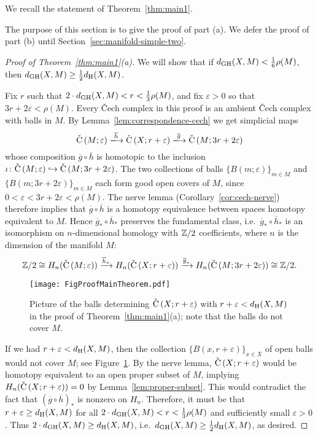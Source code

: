 \documentclass[11pt, reqno, english]{amsart}
\newcommand{\og}{\overline{g}}
\newcommand{\oh}{\overline{h}}
\begin{document}
We recall the statement of Theorem~\ref{thm:main1}.

\vspace{3mm}
\mainOne*
\vspace{3mm}

The purpose of this section is to give the proof of part (a).
We defer the proof of part (b) until Section~\ref{sec:manifold-simple-two}.

\begin{proof}[Proof of Theorem~\ref{thm:main1}(a)]
We will show that if $d_{\mathrm{GH}}(X,M) < \frac{1}{6}\rho(M)$, then $d_{\mathrm{GH}}(X,M) \ge \frac{1}{2}d_{\mathrm{H}}(X,M)$.

Fix $r$ such that $2\cdot d_{\mathrm{GH}}(X,M)<r
<\frac{1}{3}\rho(M)$, and fix $\varepsilon>0$ so that $3r+2\varepsilon<\rho(M)$.
Every \v{C}ech complex in this proof is an ambient \v{C}ech complex with balls in $M$.
By Lemma~\ref{lem:correspondence-cech} we get simplicial maps
\[
\cech{M}{\varepsilon} 
\xlongrightarrow{\oh} \cech{X}{r+\varepsilon}
\xlongrightarrow{\og} \cech{M}{3r+2\varepsilon}
\]    
whose composition $\og \circ \oh$ is homotopic to the inclusion
$\iota\colon \mathrm{\check{C}}\left(M;\varepsilon\right) \hookrightarrow \mathrm{\check{C}}\left(M;3r+2\varepsilon\right)$.
The two collections of balls $\{B(m;\varepsilon)\}_{m\in M}$ and $\{B(m;3r+2\varepsilon)\}_{m\in M}$ each form good open covers of $M$, since $0<\varepsilon<3r+2\varepsilon<\rho(M)$.
The nerve lemma (Corollary~\ref{cor:cech-nerve}) therefore implies that $\og \circ \oh$ is a homotopy equivalence between spaces homotopy equivalent to $M$.
Hence $\og_*\circ\oh_*$ preserves the fundamental class, i.e.\ $\og_*\circ\oh_*$ is an isomorphism on $n$-dimensional homology with $\mathbb{Z}/2$ coefficients, where $n$ is the dimension of the manifold $M$:
\[\Z/2 \cong H_n(\cech{M}{\varepsilon}) \xrightarrow{\oh_*} H_n(\cech{X}{r+\varepsilon}) \xrightarrow{\og_*} H_n(\cech{M}{3r+2\varepsilon}) \cong \Z/2.\]

\begin{figure}[htb]
\centering
\texttt{[image: FigProofMainTheorem.pdf]}
\caption{Picture of the balls determining $\mathrm{\check{C}}\left(X;r+\varepsilon\right)$ with $r+\varepsilon < d_{\mathrm{H}}(X,M)$ in the proof of Theorem~\ref{thm:main1}(a); note that the balls do not cover $M$.}
\label{fig:proof-main-thm}
\end{figure}

If we had $r+\varepsilon < d_{\mathrm{H}}(X,M)$, then the collection $\{B(x,r+\varepsilon)\}_{x\in X}$ of open balls would not cover $M$; see Figure~\ref{fig:proof-main-thm}.
By the nerve lemma, $\mathrm{\check{C}}\left(X;r+\varepsilon\right)$ would be homotopy equivalent to an open proper subset of $M$, implying $H_n(\mathrm{\check{C}}\left(X;r+\varepsilon\right))=0$ by Lemma~\ref{lem:proper-subset}.
This would contradict the fact that $(\og \circ \oh)_*$ is nonzero on $H_n$.
Therefore, it must be that $r+\varepsilon \ge d_{\mathrm{H}}(X,M)$ for all $2\cdot d_{\mathrm{GH}}(X,M)<r
<\frac{1}{3}\rho(M)$ and sufficiently small $\varepsilon>0$.
Thus $2\cdot d_{\mathrm{GH}}(X,M) \ge d_{\mathrm{H}}(X,M)$, i.e.\ $d_{\mathrm{GH}}(X,M)\geq\frac{1}{2}d_{\mathrm{H}}(X,M)$, as desired.
\end{proof}
\end{document}
